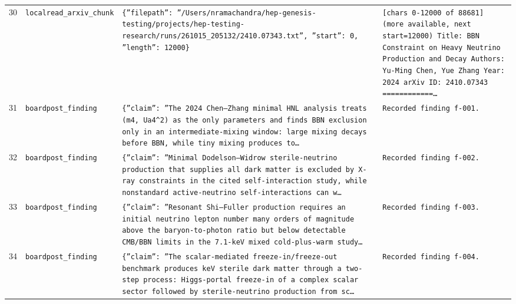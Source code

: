 \documentclass[11pt,a4paper]{article}
\begin{document}
\begin{longtable}{@{}p{}p{}p{}p{}@{}}
30 & \texttt{local}\newline\texttt{read\_\allowbreak{}arxiv\_\allowbreak{}chunk} & \texttt{\{''filepath'':\allowbreak{} ''/\allowbreak{}Users/\allowbreak{}nramachandra/\allowbreak{}hep-genesis-testing/\allowbreak{}projects/\allowbreak{}hep-testing-research/\allowbreak{}runs/\allowbreak{}261015\_\allowbreak{}205132/\allowbreak{}2410.07343.txt'',\allowbreak{} ''start'':\allowbreak{} 0,\allowbreak{} ''length'':\allowbreak{} 12000\}\allowbreak{}} & \texttt{[chars 0-12000 of 88681]\allowbreak{} (more available,\allowbreak{} next start=\allowbreak{}12000)\allowbreak{}  Title:\allowbreak{} BBN Constraint on Heavy Neutrino Production and Decay Authors:\allowbreak{} Yu-Ming Chen,\allowbreak{} Yue Zhang Year:\allowbreak{} 2024 arXiv ID:\allowbreak{} 2410.07343  =\allowbreak{}=\allowbreak{}=\allowbreak{}=\allowbreak{}=\allowbreak{}=\allowbreak{}=\allowbreak{}=\allowbreak{}=\allowbreak{}=\allowbreak{}=\allowbreak{}=\allowbreak{}\ldots{}\allowbreak{}} \\
31 & \texttt{board}\newline\texttt{post\_\allowbreak{}finding} & \texttt{\{''claim'':\allowbreak{} ''The 2024 Chen--Zhang minimal HNL analysis treats (m4,\allowbreak{} \textbar{}\allowbreak{}Ua4\textbar{}\allowbreak{}\textasciicircum{}\allowbreak{}2)\allowbreak{} as the only parameters and finds BBN exclusion only in an intermediate-mixing window:\allowbreak{} large mixing decays before BBN,\allowbreak{} while tiny mixing produces to\ldots{}\allowbreak{}} & \texttt{Recorded finding f-001.} \\
32 & \texttt{board}\newline\texttt{post\_\allowbreak{}finding} & \texttt{\{''claim'':\allowbreak{} ''Minimal Dodelson--Widrow sterile-neutrino production that supplies all dark matter is excluded by X-ray constraints in the cited self-interaction study,\allowbreak{} while nonstandard active-neutrino self-interactions can w\ldots{}\allowbreak{}} & \texttt{Recorded finding f-002.} \\
33 & \texttt{board}\newline\texttt{post\_\allowbreak{}finding} & \texttt{\{''claim'':\allowbreak{} ''Resonant Shi--Fuller production requires an initial neutrino lepton number many orders of magnitude above the baryon-to-photon ratio but below detectable CMB/\allowbreak{}BBN limits in the 7.1-keV mixed cold-plus-warm study\ldots{}\allowbreak{}} & \texttt{Recorded finding f-003.} \\
34 & \texttt{board}\newline\texttt{post\_\allowbreak{}finding} & \texttt{\{''claim'':\allowbreak{} ''The scalar-mediated freeze-in/\allowbreak{}freeze-out benchmark produces keV sterile dark matter through a two-step process:\allowbreak{} Higgs-portal freeze-in of a complex scalar sector followed by sterile-neutrino production from sc\ldots{}\allowbreak{}} & \texttt{Recorded finding f-004.} \\

\end{longtable}
\end{document}

